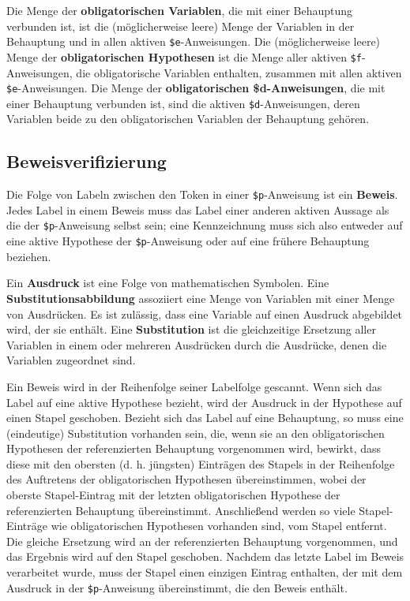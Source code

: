Die Menge der {\bf obligatorischen Variablen}, die mit einer Behauptung verbunden ist, ist die (möglicherweise leere) Menge der Variablen in der Behauptung und in allen aktiven \texttt{\$e}-Anweisungen.  Die (möglicherweise leere) Menge der {\bf obligatorischen Hypothesen} ist die Menge aller aktiven \texttt{\$f}-Anweisungen, die obligatorische Variablen enthalten, zusammen mit allen aktiven \texttt{\$e}-Anweisungen. Die Menge der {\bf obligatorischen {\bf \$d}-Anweisungen}, die mit einer Behauptung verbunden ist, sind die aktiven \texttt{\$d}-Anweisungen, deren Variablen beide zu den obligatorischen Variablen der Behauptung gehören.

\subsection{Beweisverifizierung}\label{spec4}

Die Folge von Labeln zwischen den Token in einer \texttt{\$p}-Anweisung ist ein {\bf Beweis}. Jedes Label in einem Beweis muss das Label einer anderen aktiven Aussage als die der \texttt{\$p}-Anweisung selbst sein; eine Kennzeichnung muss sich also entweder auf eine aktive Hypothese der \texttt{\$p}-Anweisung oder auf eine frühere Behauptung beziehen.

Ein {\bf Ausdruck} ist eine Folge von mathematischen Symbolen. Eine {\bf Substitutionsabbildung} assoziiert eine Menge von Variablen mit einer Menge von Ausdrücken.  Es ist zulässig, dass eine Variable auf einen Ausdruck abgebildet wird, der sie enthält.  Eine {\bf Substitution} ist die gleichzeitige Ersetzung aller Variablen in einem oder mehreren Ausdrücken durch die Ausdrücke, denen die Variablen zugeordnet sind.

Ein Beweis wird in der Reihenfolge seiner Labelfolge gescannt.  Wenn sich das Label auf eine aktive Hypothese bezieht, wird der Ausdruck in der Hypothese auf einen Stapel geschoben.  Bezieht sich das Label auf eine Behauptung, so muss eine (eindeutige) Substitution vorhanden sein, die, wenn sie an den obligatorischen Hypothesen der referenzierten Behauptung vorgenommen wird, bewirkt, dass diese mit den obersten (d. h. jüngsten) Einträgen des Stapels in der Reihenfolge des Auftretens der obligatorischen Hypothesen übereinstimmen, wobei der oberste Stapel-Eintrag mit der letzten obligatorischen Hypothese der referenzierten Behauptung übereinstimmt.  Anschließend werden so viele Stapel-Einträge wie obligatorischen Hypothesen vorhanden sind, vom Stapel entfernt.  Die gleiche Ersetzung wird an der referenzierten Behauptung vorgenommen, und das Ergebnis wird auf den Stapel geschoben. Nachdem das letzte Label im Beweis verarbeitet wurde, muss der Stapel einen einzigen Eintrag enthalten, der mit dem Ausdruck in der \texttt{\$p}-Anweisung übereinstimmt, die den Beweis enthält.

